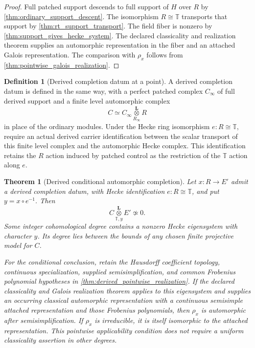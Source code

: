 \documentclass[11pt]{amsart}
\newtheorem{theorem}{Theorem}[section]
\theoremstyle{definition}
\newtheorem{definition}[definition]{Definition}
\theoremstyle{remark}
\newcommand{\TT}{\mathbb T}
\begin{document}
\begin{proof}
Full patched support descends to full support of \(H\) over \(R\) by
\cref{thm:ordinary_support_descent}. The isomorphism \(R\cong\TT\) transports that support by \cref{thm:rt_support_transport}. The field fiber is nonzero by
\cref{thm:support_gives_hecke_system}. The declared classicality and realization theorem supplies an automorphic representation in the fiber and an attached Galois representation. The comparison with \(\rho_x\) follows from \cref{thm:pointwise_galois_realization}.
\end{proof}

\begin{definition}[Derived completion datum at a point]\label{def:derived_completion_datum}
A derived completion datum is defined in the same way, with a perfect patched complex
\(C_\infty\) of full derived support and a finite level automorphic complex
\[
C
\simeq
C_\infty
\mathbin{\mathop{\otimes}\limits_{R_\infty}^{\mathbf L}}R
\]
in place of the ordinary modules. Under the Hecke ring isomorphism \(e:R\cong\TT\), require an actual derived carrier identification between the scalar transport of this finite level complex and the automorphic Hecke complex. This identification retains the \(R\) action induced by patched control as the restriction of the \(\TT\) action along \(e\).
\end{definition}

\begin{theorem}[Derived conditional automorphic completion]\label{thm:derived_conditional_completion}
Let \(x:R\to E'\) admit a derived completion datum, with Hecke identification \(e:R\cong\TT\), and put \(y=x\circ e^{-1}\). Then
\[
\boxed{
C\mathbin{\mathop{\otimes}\limits_{\TT,y}^{\mathbf L}}E'\not\simeq0.
}
\]
Some integer cohomological degree contains a nonzero Hecke eigensystem with character \(y\). Its degree lies between the bounds of any chosen finite projective model for \(C\).

For the conditional conclusion, retain the Hausdorff coefficient topology, continuous specialization, supplied semisimplification, and common Frobenius polynomial hypotheses in \cref{thm:derived_pointwise_realization}. If the declared classicality and Galois realization theorem applies to this eigensystem and supplies an occurring classical automorphic representation with a continuous semisimple attached representation and those Frobenius polynomials, then \(\rho_x\) is automorphic after semisimplification. If \(\rho_x\) is irreducible, it is itself isomorphic to the attached representation. This pointwise applicability condition does not require a uniform classicality assertion in other degrees.
\end{theorem}
\end{document}
